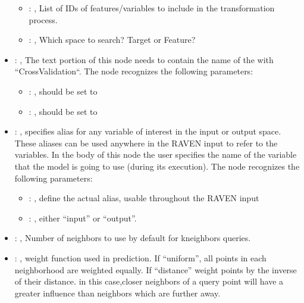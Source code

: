 \begin{itemize}
\begin{itemize}
        \item {}: , 
          List of IDs of features/variables to include in the transformation process.

        \item {}: , 
          Which space to search? Target or Feature?
      \end{itemize}

    \item {}: , 
      The text portion of this node needs to contain the name of the  with
               ``CrossValidation``.
      The  node recognizes the following parameters:
        \begin{itemize}
          \item {}: , 
            should be set to 
          \item {}: , 
            should be set to 
      \end{itemize}

    \item {}: , 
      specifies alias for         any variable of interest in the input or output space. These
      aliases can be used anywhere in the RAVEN input to         refer to the variables. In the body
      of this node the user specifies the name of the variable that the model is going to use
      (during its execution).
      The  node recognizes the following parameters:
        \begin{itemize}
          \item {}: , 
            define the actual alias, usable throughout the RAVEN input
          \item {}: , 
            either ``input'' or ``output''.
      \end{itemize}

    \item {}: , 
      Number of neighbors to use by default for kneighbors queries.

    \item {}: , 
      weight function used in prediction. If ``uniform'', all points in each neighborhood
      are weighted equally. If ``distance'' weight points by the inverse of their distance. in this
      case,closer neighbors of a query point will have a greater influence than neighbors which are
      further away.


\end{itemize}
